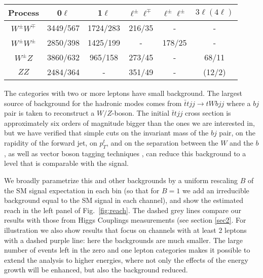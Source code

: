\begin{center}
\begin{tabular}{|c|c|c|c|c|c|}
\hline
Process& 0$\ell$ & 1$\ell$ & $\ell^\pm\ell^\mp$ & $\ell^\pm\ell^\pm$ & $3\ell(4\ell)$\\
 \hline
 $W^\pm W^\mp$    &  3449/567 & 1724/283 & 216/35 & - & -  \\
 $W^\pm W^\pm$    &  2850/398 & 1425/199 & - & 178/25 & -  \\
 $W^\pm Z$   &  3860/632& 965/158 & 273/45 & - & 68/11 \\
 $Z Z$    &  2484/364& - & 351/49 & - &  (12/2) \\\hline
\end{tabular}
 \end{center}
 
The categories with two or more leptons have small background.
%
The largest source of background for the hadronic modes comes from $\bar t t jj\to tWbjj$ where a $bj$ pair is taken to reconstruct a $W/Z$-boson.
The initial $\bar{t}tjj$ cross section is approximately six orders of magnitude bigger than the ones we are interested in, but we have verified that simple cuts on the invariant mass of the $bj$ pair, on the rapidity of the forward jet, on $p_T^t$, and on the separation between the $W$ and the $b$, as well as vector boson tagging techniques \cite{ATLAS-CONF-2018-016}, can reduce this background to a level that is comparable with the signal.

We broadly parametrize this and other backgrounds by a uniform rescaling $B$ of the SM signal expectation in each bin (so that for $B=1$ we add an irreducible background equal to the SM signal in each channel), and show the estimated reach in the left panel of Fig.~\ref{fig:reach}. The dashed grey lines compare our results with those from Higgs Couplings  measurements (see section \ref{sec2}. For illustration we also show  results that focus on channels with at least 2 leptons with a dashed purple line: here the backgrounds are much smaller. The large number of events left in the zero and one lepton categories makes it possible to extend the analysis to higher energies, where not only the effects of the energy growth will be enhanced, but also the background reduced.






